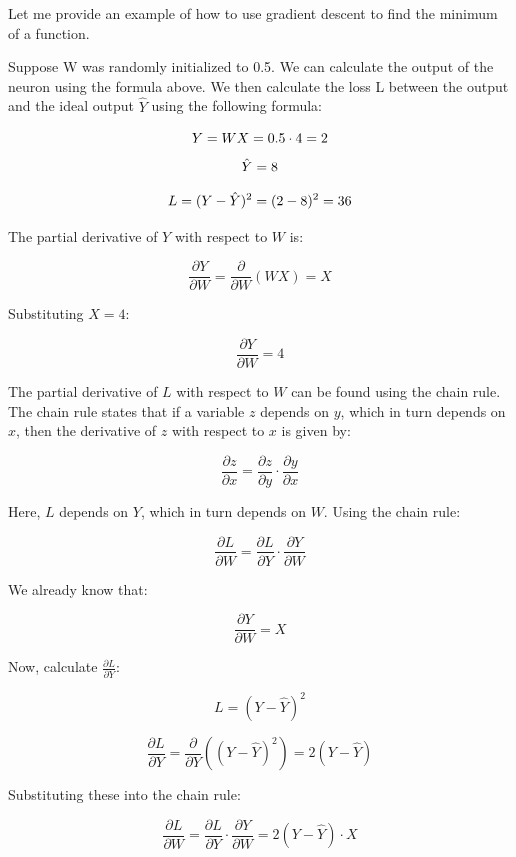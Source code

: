 \documentclass[12pt,a4paper]{article}
\begin{document}
Let me provide an example of how to use gradient descent to find the minimum of a function.

Suppose W was randomly initialized to 0.5. We can calculate the output of the neuron using the formula above. We then calculate the loss L between the output and the ideal output $\hat{Y}$ using the following formula:

\[
Y=WX \\ = 0.5 \cdot 4 \\ = 2 \\
\]
\[
\hat{Y}=8 \\
\]

\[
L = (Y - \hat{Y})^2 \\ = (2 - 8)^2 \\ = 36 \\
\]

The partial derivative of \( Y \) with respect to \( W \) is:

\[
\frac{\partial Y}{\partial W} = \frac{\partial}{\partial W}(WX) = X
\]

Substituting \( X = 4 \):

\[
\frac{\partial Y}{\partial W} = 4
\]

The partial derivative of \( L \) with respect to \( W \) can be found using the chain rule. The chain rule states that if a variable \( z \) depends on \( y \), which in turn depends on \( x \), then the derivative of \( z \) with respect to \( x \) is given by:

\[
\frac{\partial z}{\partial x} = \frac{\partial z}{\partial y} \cdot \frac{\partial y}{\partial x}
\]

Here, \( L \) depends on \( Y \), which in turn depends on \( W \). Using the chain rule:

\[
\frac{\partial L}{\partial W} = \frac{\partial L}{\partial Y} \cdot \frac{\partial Y}{\partial W}
\]

We already know that:

\[
\frac{\partial Y}{\partial W} = X
\]

Now, calculate \( \frac{\partial L}{\partial Y} \):

\[
L = (Y - \hat{Y})^2
\]

\[
\frac{\partial L}{\partial Y} = \frac{\partial}{\partial Y}((Y - \hat{Y})^2) = 2(Y - \hat{Y})
\]

Substituting these into the chain rule:

\[
\frac{\partial L}{\partial W} = \frac{\partial L}{\partial Y} \cdot \frac{\partial Y}{\partial W} = 2(Y - \hat{Y}) \cdot X
\]
\end{document}
